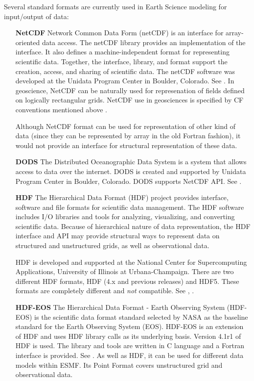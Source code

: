 Several standard formats are currently used in Earth Science modeling
for input/output of data:

\begin{itemize}
\item[\bf NetCDF] Network Common Data Form (netCDF) is an interface for 
array-oriented data access. The netCDF library provides an
implementation of the interface. It also defines a 
machine-independent format for representing scientific data. Together,
the interface, library, and format support the creation, access, and
sharing of scientific data. The netCDF software was developed at the
Unidata Program Center in Boulder, Colorado. See \cite{NetCDF3_UsersGuide_C}.
In geoscience, NetCDF can be naturally used for represenation of fields 
defined on logically rectangular grids. NetCDF use in geosciences is 
specified by CF conventions mentioned above \cite{NetCDF_CF_v1_beta3}.

Although NetCDF format can be used for representation of other kind of data 
(since they can be represented by array in the old Fortran fashion), it would 
not provide an interface for structural representation of these data. 

\item[\bf DODS] The Distributed Oceanographic Data System is a system that 
allows access to data over the internet. DODS is created and supported by 
Unidata Program Center in Boulder, Colorado. DODS supports NetCDF API. See 
\cite{DODS}.

\item[\bf HDF] The Hierarchical Data Format (HDF) project provides
interface,  software and file formats for scientific data management. 
The HDF software includes I/O libraries and tools for analyzing,
visualizing, and converting scientific data. Because of hierarchical nature 
of data representation, the HDF interface and API may provide structural ways 
to represent data on structured and unstructured grids, as well as 
observational data. 

HDF is developed and supported at the National Center for Supercomputing 
Applications, University of Illinois at Urbana-Champaign. There are two 
different HDF formats, HDF (4.x and previous releases) and HDF5. These 
formats are completely different and {\it not} compatible.  See
\cite{HDF4_tutorials}, \cite{HDF5_tutorial}.

\item[\bf HDF-EOS]  The Hierarchical Data Format - Earth Observing
System (HDF-EOS) is the scientific data format standard selected by
NASA as the baseline standard for the Earth Observing System (EOS). HDF-EOS
is an extension of HDF and uses HDF library calls as its underlying
basis. Version 4.1r1 of HDF is used. The library and tools are written
in C language and a Fortran interface is provided. See \cite{HDF-EOS}.
As well as HDF, it can be used for different data models within ESMF. Its 
Point Format covers unstructured grid and observational data.


\end{itemize}
